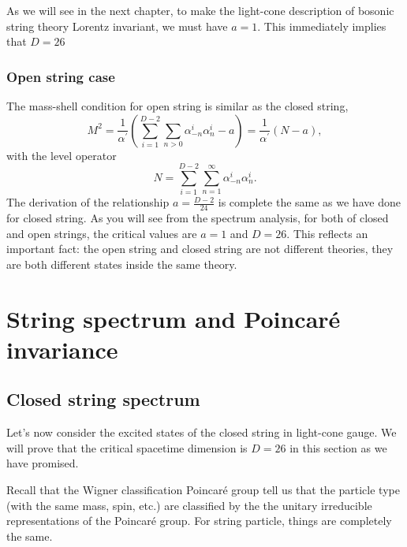 \documentclass[graybox,envcountchap,sectrefs]{svmono}
\begin{document}
As we will see in the next chapter, to make the light-cone description of bosonic string theory Lorentz invariant, we must have $a=1$. This immediately implies that $D=26$


\subsubsection*{Open string case}
The mass-shell condition for open string is similar as the closed string,
\begin{equation}
M^{2}=\frac{1}{\alpha^{\prime}}\left(\sum_{i=1}^{D-2} \sum_{n>0} \alpha_{-n}^{i} \alpha_{n}^{i}-a\right)=\frac{1}{\alpha^{\prime}}(N-a),
\end{equation}
with the level operator
 \begin{equation}
N=\sum_{i=1}^{D-2} \sum_{n=1}^{\infty} \alpha_{-n}^{i} \alpha_{n}^{i}.
\end{equation}
The derivation of the relationship $a=\frac{D-2}{24}$ is complete the same as we have done for closed string.
As you will see from the spectrum analysis, for both of closed and open strings, the critical values are $a=1$ and $D=26$.
This reflects an important fact: the open string and closed string are not different theories, they are both different states inside the same theory.

\section{String spectrum and Poincar\'{e} invariance}

\subsection{Closed string spectrum}
Let's now consider the excited states of the closed string in light-cone gauge.
We will prove that the critical spacetime dimension is $D=26$ in this section as we have promised.

Recall that the Wigner classification Poincar\'{e} group tell us that the particle type (with the same mass, spin, etc.) are classified by the the unitary irreducible representations of the Poincar\'{e} group. For string particle, things are completely the same.
\end{document}
